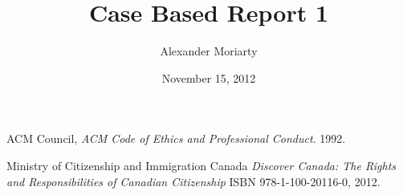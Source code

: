 \documentclass[11pt, oneside]{report}   	%
\title{Case Based Report 1}
\author{Alexander Moriarty}
\date{November 15, 2012}						%
\begin{document}
\setcounter{secnumdepth}{-1}
\maketitle
%





\begin{thebibliography}{9}

  ACM Council,
  \emph{ACM Code of Ethics and Professional Conduct}.
  1992.

	Ministry of Citizenship and Immigration Canada
	\emph{Discover Canada: The Rights and Responsibilities of Canadian Citizenship}
	ISBN 978-1-100-20116-0,
	2012.
	
\end{thebibliography}
\end{document}
